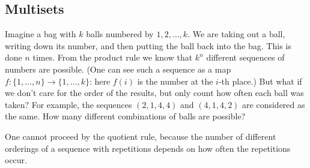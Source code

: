 \subsection{Multisets}
Imagine a bag with $k$ balls numbered by $1, 2, \ldots, k$.
We are taking out a ball, writing down its number, and then putting the ball back into the bag.
This is done $n$ times.
From the product rule we know that $k^n$ different sequences of numbers are possible.
(One can see such a sequence as a map $f \colon \{1, \ldots, n\} \to \{1, \ldots, k\}$: here $f(i)$ is the number at the $i$-th place.)
But what if we don't care for the order of the results, but only count how often each ball was taken?
For example, the sequences $(2, 1, 4, 4)$ and $(4, 1, 4, 2)$ are considered as the same.
How many different combinations of balls are possible?

One cannot proceed by the quotient rule, because the number of different orderings of a sequence with repetitions depends on how often the repetitions occur.
